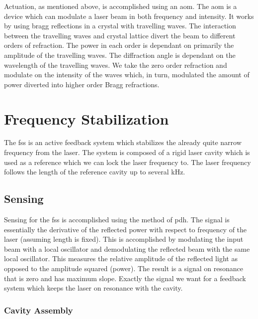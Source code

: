 Actuation, as mentioned above, is accomplished using an \ac{aom}. The
\ac{aom} is a device which can modulate a laser beam in both frequency
and intensity. It works by using bragg reflections in a crystal with
travelling waves. The interaction between the travelling waves and crystal
lattice divert the beam to different orders of refraction. The power in each
order is dependant on primarily the amplitude of the travelling waves. The
diffraction angle is dependant on the wavelength of the travelling waves.
We take the zero order refraction and modulate on the intensity of the
waves which, in turn, modulated the amount of power diverted into higher order
Bragg refractions.

\section{Frequency Stabilization}

The \ac{fss} is an active feedback system which stabilizes the already quite
narrow frequency from the laser. The system is composed of a rigid laser cavity
which is used as a reference which we can lock the laser frequency to. The
laser frequency follows the length of the reference cavity up to several kHz.

\subsection{Sensing}

Sensing for the \ac{fss} is accomplished using the method of \ac{pdh}. The
signal is essentially the derivative of the reflected power with respect to
frequency of the laser (assuming length is fixed). This is accomplished by
modulating the input beam with a local oscillator and demodulating the
reflected beam with the same local oscillator. This measures the relative
amplitude of the reflected light as opposed to the amplitude squared (power).
The result is a signal on resonance that is zero and has maximum slope.
Exactly the signal we want for a feedback system which keeps the laser on
resonance with the cavity.

\subsubsection{Cavity Assembly}

